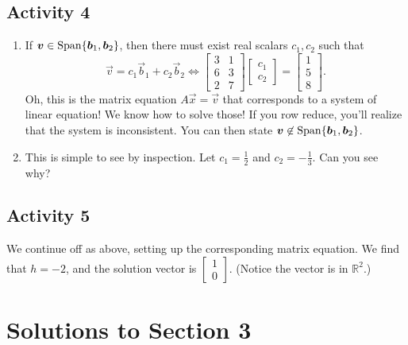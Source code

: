 \subsection{Activity 4}
\begin{enumerate}
	\item If \(\bm{v} \in \operatorname{Span} \{\bm{b}_1, \bm{b}_2\}\), then there must exist real scalars \(c_1, c_2\) such that 
		\[\vec{v} = c_1\vec{b}_1 + c_2\vec{b}_2 \iff \begin{bmatrix}3 & 1 \\ 6 & 3 \\ 2 & 7\end{bmatrix}\begin{bmatrix}c_1 \\ c_2\end{bmatrix} 
	   	= \begin{bmatrix}1 \\ 5 \\ 8\end{bmatrix}.\]
		Oh, this is the matrix equation \(A\vec{x} = \vec{v}\) that corresponds to a system of linear equation! We know how to solve those!
		If you row reduce, you'll realize that the system is inconsistent. You can then state \(\bm{v} \not\in \operatorname{Span}\{\bm{b}_1, \bm{b}_2\}\).
	\item This is simple to see by inspection. Let \(c_1 = \frac{1}{2}\) and \(c_2 = -\frac{1}{3}\). Can you see why?
\end{enumerate}

\subsection{Activity 5}
We continue off as above, setting up the corresponding matrix equation. We find that \(h = -2\), and the solution vector is 
\(\begin{bmatrix}1 \\ 0\end{bmatrix}\). (Notice the vector is in \(\mathbb{R}^2\).)

\section{Solutions to Section 3}
